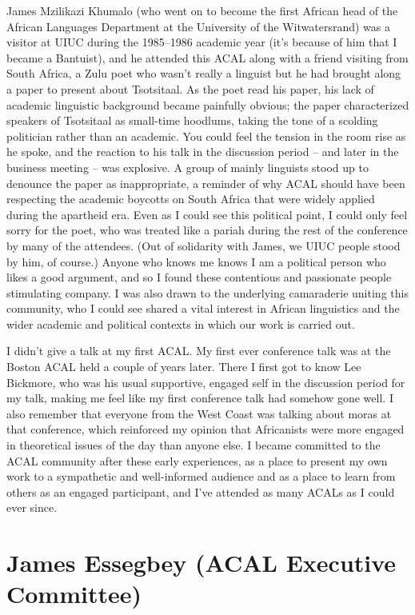 \documentclass[output=paper]{langscibook}
\begin{document}
James Mzilikazi Khumalo (who went on to become the first African head of the African Languages Department at the University of the Witwatersrand) was a visitor at UIUC during the 1985--1986 academic year (it’s because of him that I became a Bantuist), and he attended this ACAL along with a friend visiting from South Africa, a Zulu poet who wasn’t really a linguist but he had brought along a paper to present about Tsotsitaal. As the poet read his paper, his lack of academic linguistic background became painfully obvious; the paper characterized speakers of Tsotsitaal as small-time hoodlums, taking the tone of a scolding politician rather than an academic. You could feel the tension in the room rise as he spoke, and the reaction to his talk in the discussion period -- and later in the business meeting --  was explosive. A group of mainly linguists stood up to denounce the paper as inappropriate, a reminder of why ACAL should have been respecting the academic boycotts on South Africa that were widely applied during the apartheid era. Even as I could see this political point, I could only feel sorry for the poet, who was treated like a pariah during the rest of the conference by many of the attendees. (Out of solidarity with James, we UIUC people stood by him, of course.) Anyone who knows me knows I am a political person who likes a good argument, and so I found these contentious and passionate people stimulating company. I was also drawn to the underlying camaraderie uniting this community, who I could see shared a vital interest in African linguistics and the wider academic and political contexts in which our work is carried out.

I didn’t give a talk at my first ACAL. My first ever conference talk was at the Boston ACAL held a couple of years later. There I first got to know Lee Bickmore, who was his usual supportive, engaged self in the discussion period for my talk, making me feel like my first conference talk had somehow gone well. I also remember that everyone from the West Coast was talking about moras at that conference, which reinforced my opinion that Africanists were more engaged in theoretical issues of the day than anyone else. I became committed to the ACAL community after these early experiences, as a place to present my own work to a sympathetic and well-informed audience and as a place to learn from others as an engaged participant, and I’ve attended as many ACALs as I could ever since.

\section*{James Essegbey (ACAL Executive Committee)}
\end{document}
